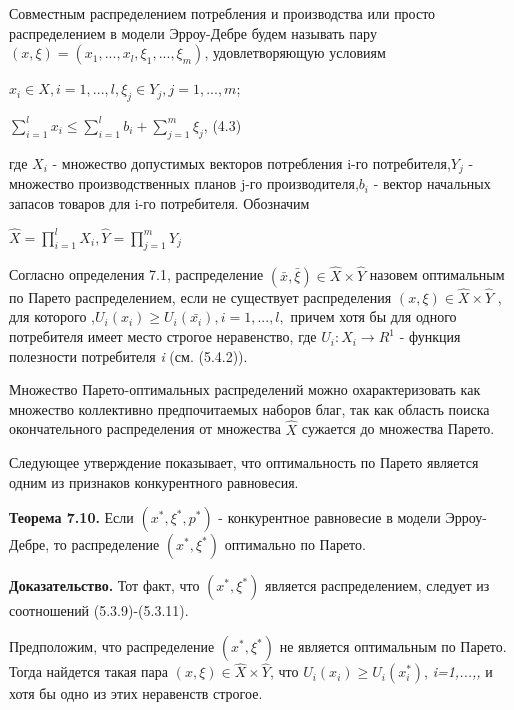 \documentclass[12pt, 4paper]{book}
\begin{document}
{Совместным распределением потребления и производства или просто распределением в модели Эрроу-Дебре будем называть пару $(x,\xi)=(x_1,...,x_l,\xi_1,...,\xi_m)$, удовлетворяющую условиям
\begin{center}
$x_i \in X , i=1,...,l, \xi_j \in Y_j , j=1,...,m$;
\end{center}
\begin{center}
$\sum\limits_{i=1}^{l}x_i \leq \sum\limits_{i=1}^{l}b_i + \sum\limits_{j=1}^{m}\xi_j$, (4.3)
\end{center}
где $X_i$ - множество допустимых векторов потребления i-го потребителя,$Y_j$ - множество производственных планов j-го производителя,$b_i$ - вектор начальных запасов товаров для i-го потребителя. Обозначим 
\begin{center}
$\hat{X} = \prod\limits_{i=1}^{l}X_i, \hat{Y}=\prod\limits_{j=1}^{m}Y_j$
\end{center}
\par

Согласно определения 7.1, распределение $(\bar{x},\bar{\xi})\in \hat{X} \times \hat{Y}$ назовем оптимальным по Парето распределением, если не существует распределения $(x,\xi)\in \hat{X} \times \hat{Y}$ , для которого ,$U_i(x_i) \geq U_i(\bar{x_i}), i=1,...,l,$ причем хотя бы для одного потребителя имеет место строгое неравенство, где $U_i : X_i \rightarrow R^1$ - функция полезности потребителя \textit{i} (см. (5.4.2)). 
\par

Множество Парето-оптимальных распределений можно охарактеризовать как множество коллективно предпочитаемых наборов благ, так как область поиска окончательного распределения от множества $\hat{X}$ сужается до множества Парето.
\par

Следующее утверждение показывает, что оптимальность по Парето является одним из признаков конкурентного равновесия.
\par

\textbf{Теорема 7.10.} Если $(x^{*},\xi^{*},p^{*})$ - конкурентное равновесие в модели Эрроу-Дебре, то распределение $(x^{*},\xi^{*})$ оптимально по Парето.
\par

\textbf{Доказательство.} Тот факт, что $(x^{*},\xi^{*})$ является распределением, следует из соотношений (5.3.9)-(5.3.11).
\par

Предположим, что распределение $(x^{*},\xi^{*})$ не является оптимальным по Парето. Тогда найдется такая пара $(x,\xi) \in \hat{X} \times \hat{Y}$, что $U_i(x_i) \geq U_i(x_{i}^{*})$, \textit{i=1,...,,} и хотя бы одно из этих неравенств строгое.
\par

}
\end{document}
